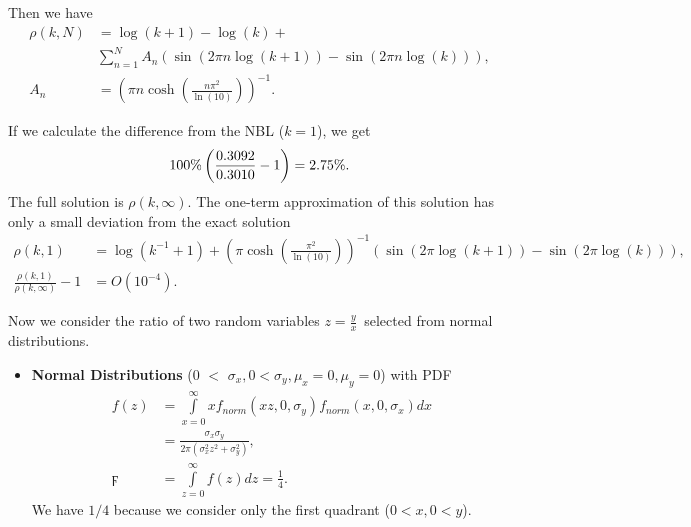 \documentclass[titlepage,fleqn]{article}%
\begin{document}
Then we have%
\begin{align}
\rho(k,N)  &  =\log(k+1)-\log(k)+\nonumber\\
&
{\displaystyle\sum\limits_{n=1}^{N}}
A_{n}\left(  \sin(2\pi n\log(k+1))-\sin(2\pi n\log(k))\right)  ,\label{2NumbR}%
\\
A_{n}  &  =\left(  \pi n\cosh\left(  \frac{n\pi^{2}}{\ln(10)}\right)  \right)
^{-1}.\nonumber
\end{align}


If we calculate the difference from the NBL ($k=1$), we get%
\[
100\%\left(  \frac{0{\small .3092}}{0.3010}-1\right)  =2.75\%.
\]
The full solution is $\rho(k,\infty).$ The one-term approximation of this
solution has only a small deviation from the exact solution
\begin{align*}
\rho(k,1)  &  =\log(k^{-1}+1)+\left(  \pi\cosh\left(  \frac{\pi^{2}}{\ln
(10)}\right)  \right)  ^{-1}\left(  \sin(2\pi\log(k+1))-\sin(2\pi
\log(k))\right)  ,\\
\frac{\rho(k,1)}{\rho(k,\infty)}-1  &  =O\left(  10^{-4}\right)  .
\end{align*}


Now we consider the ratio of two random variables $z=\frac{y}{x}$\ selected
from normal distributions.

\begin{itemize}
\item \textbf{Normal Distributions} ($0$%
$<$%
$\sigma_{x},0<\sigma_{y},\mu_{x}=0,\mu_{y}=0$) with PDF%
\begin{align*}
f(z)  &  =%
{\displaystyle\int\limits_{x=0}^{\infty}}
xf_{norm}(xz,0,\sigma_{y})f_{norm}(x,0,\sigma_{x})dx\\
&  =\frac{\sigma_{x}\sigma_{y}}{2\pi\left(  \sigma_{x}^{2}z^{2}+\sigma_{y}%
^{2}\right)  },\\
\digamma &  =%
{\displaystyle\int\limits_{z=0}^{\infty}}
f(z)dz=\frac{1}{4}.
\end{align*}
We have $1/4$ because we consider only the first quadrant ($0<x,0<y$).
\end{itemize}
\end{document}
